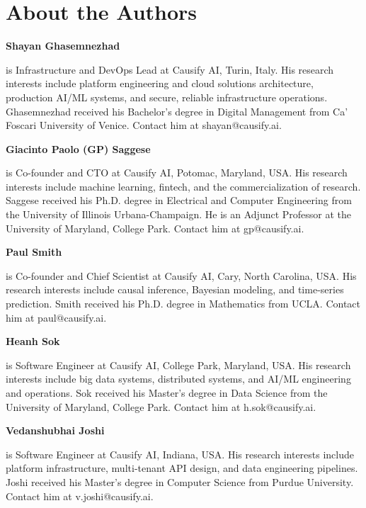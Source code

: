 \documentclass[11pt, reqno]{amsart}
\newenvironment{authorbio}[1]{%
  \par\noindent\textbf{#1}\nobreakspace\ignorespaces
}{\par\vspace{0.4em}}
\begin{document}



\section*{About the Authors}

\begin{authorbio}{Shayan Ghasemnezhad}
is Infrastructure and DevOps Lead at Causify AI, Turin, Italy. His research interests include platform engineering and cloud solutions architecture, production AI/ML systems, and secure, reliable infrastructure operations. Ghasemnezhad received his Bachelor's degree in Digital Management from Ca' Foscari University of Venice. Contact him at shayan@causify.ai.
\end{authorbio}

\begin{authorbio}{Giacinto Paolo (GP) Saggese}
is Co-founder and CTO at Causify AI, Potomac, Maryland, USA. His research interests include machine learning, fintech, and the commercialization of research. Saggese received his Ph.D. degree in Electrical and Computer Engineering from the University of Illinois Urbana-Champaign. He is an Adjunct Professor at the University of Maryland, College Park. Contact him at gp@causify.ai.
\end{authorbio}

\begin{authorbio}{Paul Smith}
is Co-founder and Chief Scientist at Causify AI, Cary, North Carolina, USA. His research interests include causal inference, Bayesian modeling, and time-series prediction. Smith received his Ph.D. degree in Mathematics from UCLA. Contact him at paul@causify.ai.
\end{authorbio}

\begin{authorbio}{Heanh Sok}
is Software Engineer at Causify AI, College Park, Maryland, USA. His research interests include big data systems, distributed systems, and AI/ML engineering and operations. Sok received his Master's degree in Data Science from the University of Maryland, College Park. Contact him at h.sok@causify.ai.
\end{authorbio}

\begin{authorbio}{Vedanshubhai Joshi}
is Software Engineer at Causify AI, Indiana, USA. His research interests include platform infrastructure, multi-tenant API design, and data engineering pipelines. Joshi received his Master's degree in Computer Science from Purdue University. Contact him at v.joshi@causify.ai.
\end{authorbio}
\end{document}
